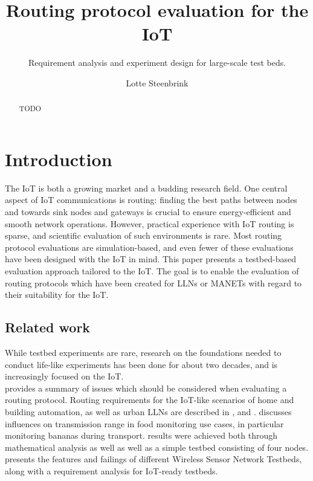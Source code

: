 \documentclass{acm_proc_article-sp}
\begin{document}
\title{Routing protocol evaluation for the IoT}
\subtitle{Requirement analysis and experiment design for large-scale test beds.}

\author{
\alignauthor
Lotte Steenbrink
}

\maketitle
\begin{abstract}
TODO
\end{abstract}


\section{Introduction}
\label{sec:Intro}
The \gls{IoT} is both a growing market and a budding research field. One central aspect of IoT communications is routing: finding the best paths between nodes and towards sink nodes and gateways is crucial to ensure energy-efficient and smooth network operations. However, practical experience with IoT routing is sparse, and scientific evaluation of such environments is rare. Most routing protocol evaluations are simulation-based, and even fewer of these evaluations have been designed with the IoT in mind.
This paper presents a testbed-based evaluation approach tailored to the IoT. The goal is to enable the evaluation of routing protocols which have been created for \glspl{LLN} or \glspl{MANET} with regard to their suitability for the IoT.

\subsection{Related work}
\label{subsec:related_work}
While testbed experiments are rare, research on the foundations needed to conduct life-like experiments has been done for about two decades, and is increasingly focused on the IoT.\\
\cite{RFC-2501} provides a summary of issues which should be considered when evaluating a routing protocol. Routing requirements for the IoT-like scenarios of home and building automation, as well as urban \glspl{LLN} are described in \cite{RFC-5826},  \cite{RFC-5867} and \cite{RFC-5548}.
\cite{food_monitoring} discusses influences on transmission range in food monitoring use cases, in particular monitoring bananas during transport. results were achieved both through mathematical analysis as well as well as a simple testbed consisting of four nodes.
\cite{testbed-survey} presents the features and failings of different Wireless Sensor Network Testbeds, along with a requirement analysis for IoT-ready testbeds.
\end{document}
